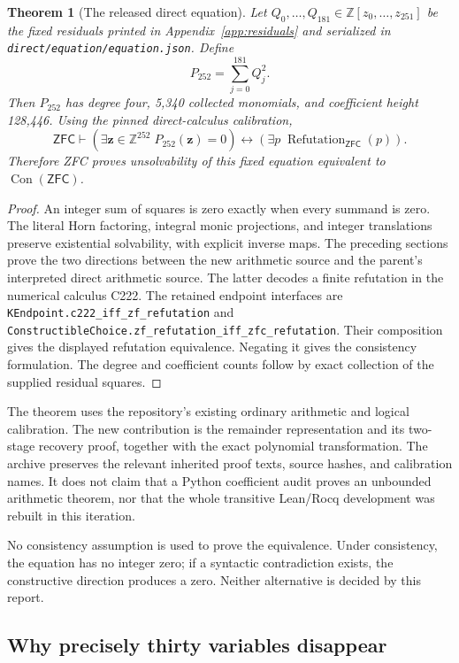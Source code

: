 \documentclass[11pt,letterpaper]{article}
\newtheorem{theorem}{Theorem}[section]
\theoremstyle{remark}\newtheorem{remark}[theorem]{Remark}
\newcommand{\Z}{\mathbb Z}\newcommand{\N}{\mathbb N}
\newcommand{\Con}{\operatorname{Con}}\newcommand{\ZFC}{\mathsf{ZFC}}
\newcommand{\file}[1]{\nolinkurl{#1}}
\begin{document}
\begin{theorem}[The released direct equation]\label{thm:main}
Let $Q_0,\ldots,Q_{181}\in\Z[z_0,\ldots,z_{251}]$ be the fixed
residuals printed in Appendix~\ref{app:residuals} and serialized in
\file{direct/equation/equation.json}. Define
\[
 P_{252}=\sum_{j=0}^{181}Q_j^2.
\]
Then $P_{252}$ has degree four, 5,340 collected monomials, and coefficient
height 128,446. Using the pinned direct-calculus calibration,
\[
 \ZFC\vdash
 (\exists\mathbf z\in\Z^{252}\;P_{252}(\mathbf z)=0)
 \longleftrightarrow
 (\exists p\;\operatorname{Refutation}_{\ZFC}(p)).
\]
Therefore ZFC proves unsolvability of this fixed equation equivalent to
$\Con(\ZFC)$.
\end{theorem}
\begin{proof}
An integer sum of squares is zero exactly when every summand is zero.
The literal Horn factoring, integral monic projections, and integer
translations preserve existential solvability, with explicit inverse
maps. The preceding sections prove the two directions between the new
arithmetic source and the parent's interpreted direct arithmetic source.
The latter decodes a finite refutation in the numerical calculus C222.
The retained endpoint interfaces are
\file{KEndpoint.c222_iff_zf_refutation} and
\file{ConstructibleChoice.zf_refutation_iff_zfc_refutation}.
Their composition gives the displayed refutation equivalence. Negating
it gives the consistency formulation. The degree and coefficient counts
follow by exact collection of the supplied residual squares.
\end{proof}

The theorem uses the repository's existing ordinary arithmetic and
logical calibration. The new contribution is the remainder representation
and its two-stage recovery proof, together with the exact polynomial
transformation. The archive preserves the relevant inherited proof texts,
source hashes, and calibration names. It does not claim that a Python
coefficient audit proves an unbounded arithmetic theorem, nor that the
whole transitive Lean/Rocq development was rebuilt in this iteration.

No consistency assumption is used to prove the equivalence. Under
consistency, the equation has no integer zero; if a syntactic contradiction
exists, the constructive direction produces a zero. Neither alternative
is decided by this report.

\subsection{Why precisely thirty variables disappear}
\end{document}
